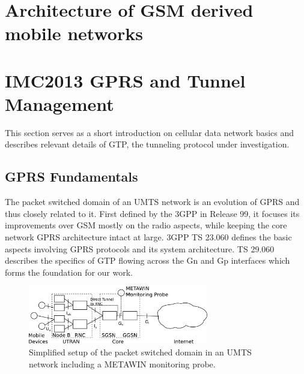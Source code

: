 %
%
\section{Architecture of GSM derived mobile networks}
\label{sec:3gpparchitecture}

\section{IMC2013 GPRS and Tunnel Management}
\label{sec:gtp-IMC}
\acresetall

This section serves as a short introduction on cellular data network basics and describes relevant details of \ac{GTP}, the tunneling protocol under investigation.


\subsection{\acs{GPRS} Fundamentals}

The packet switched domain of an \ac{UMTS} network is an evolution of \ac{GPRS} and thus closely related to it. First defined by the \ac{3GPP} in Release 99, it focuses its improvements over \ac{GSM} mostly on the radio aspects, while keeping the core network \ac{GPRS} architecture intact at large. \ac{3GPP} \ac{TS} 23.060 \cite{3gpp23060} defines the basic aspects involving \ac{GPRS} protocols and its system architecture. \ac{TS} 29.060 \cite{3gpp29060} describes the specifics of \ac{GTP} flowing across the Gn and Gp interfaces which forms the foundation for our work.

\begin{figure}
	\centering
	\includegraphics[width=0.7\textwidth]{images/IMC2013/umts-network.pdf}
	\caption{Simplified setup of the packet switched domain in an \acs{UMTS} network including a METAWIN monitoring probe.}
	\label{fig:umtsnetwork}
\end{figure}

